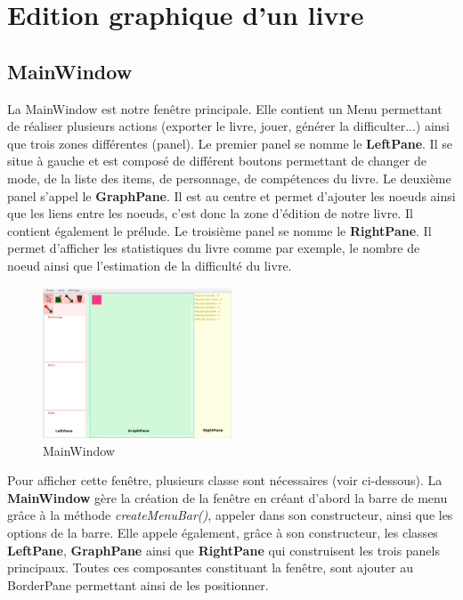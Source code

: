 	\section{Edition graphique d'un livre}

		\subsection{MainWindow}
			La MainWindow est notre fenêtre principale. Elle contient un Menu permettant de réaliser plusieurs actions (exporter le livre, jouer, générer la difficulter...) ainsi que trois zones différentes (panel). Le premier panel se nomme le \textbf{LeftPane}. Il se situe à gauche et est composé de différent boutons permettant de changer de mode, de la liste des items, de personnage, de compétences du livre. Le deuxième panel s'appel le \textbf{GraphPane}. Il est au centre et permet d'ajouter les noeuds ainsi que les liens entre les noeuds, c'est donc la zone d'édition de notre livre. Il contient également le prélude. Le troisième panel se nomme le \textbf{RightPane}. Il permet d'afficher les statistiques du livre comme par exemple, le nombre de noeud ainsi que l'estimation de la difficulté du livre.\\

			\begin{figure}[H]
				\centering\includegraphics[width=0.50\textwidth]{img/mainwindow.png}
				\caption{MainWindow}
				\label{fig:MainWindow}
			\end{figure}

			Pour afficher cette fenêtre, plusieurs classe sont nécessaires (voir ci-dessous). La \textbf{MainWindow} gère la création de la fenêtre en créant d'abord la barre de menu grâce à la méthode \textit{createMenuBar()}, appeler dans son constructeur, ainsi que les options de la barre. Elle appele également, grâce à son constructeur, les classes \textbf{LeftPane}, \textbf{GraphPane} ainsi que \textbf{RightPane} qui construisent les trois panels principaux. Toutes ces composantes constituant la fenêtre, sont ajouter au BorderPane permettant ainsi de les positionner.

